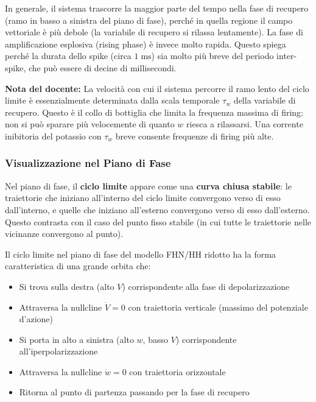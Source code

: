 In generale, il sistema trascorre la maggior parte del tempo nella fase di recupero (ramo in basso a sinistra del piano di fase), perché in quella regione il campo vettoriale è più debole (la variabile di recupero si rilassa lentamente). La fase di amplificazione esplosiva (rising phase) è invece molto rapida. Questo spiega perché la durata dello spike (circa $1 \; \text{ms}$) sia molto più breve del periodo inter-spike, che può essere di decine di millisecondi.

\begin{tcolorbox}[colback=gray!5, colframe=gray!40, arc=2mm, boxrule=0.5pt]
\textbf{Nota del docente:} La velocità con cui il sistema percorre il ramo lento del ciclo limite è essenzialmente determinata dalla scala temporale $\tau_w$ della variabile di recupero. Questo è il collo di bottiglia che limita la frequenza massima di firing: non si può sparare più velocemente di quanto $w$ riesca a rilassarsi. Una corrente inibitoria del potassio con $\tau_w$ breve consente frequenze di firing più alte.
\end{tcolorbox}

\subsubsection{Visualizzazione nel Piano di Fase}

Nel piano di fase, il \textbf{ciclo limite} appare come una \textbf{curva chiusa stabile}: le traiettorie che iniziano all'interno del ciclo limite convergono verso di esso dall'interno, e quelle che iniziano all'esterno convergono verso di esso dall'esterno. Questo contrasta con il caso del punto fisso stabile (in cui tutte le traiettorie nelle vicinanze convergono al punto).

Il ciclo limite nel piano di fase del modello FHN/HH ridotto ha la forma caratteristica di una grande orbita che:
\begin{itemize}
    \item Si trova sulla destra (alto $V$) corrispondente alla fase di depolarizzazione
    \item Attraversa la nullcline $\dot{V} = 0$ con traiettoria verticale (massimo del potenziale d'azione)
    \item Si porta in alto a sinistra (alto $w$, basso $V$) corrispondente all'iperpolarizzazione
    \item Attraversa la nullcline $\dot{w} = 0$ con traiettoria orizzontale
    \item Ritorna al punto di partenza passando per la fase di recupero
\end{itemize}



